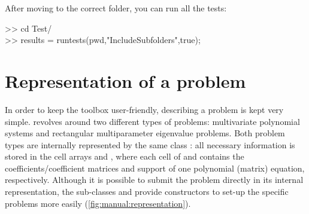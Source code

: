 \documentclass{manual}
\begin{document}
            \begin{code}
                After moving to the correct folder, you can run all the tests:
                \begin{codeblock}
                    >> cd \textcolor{string}{Test/} \\
                    >> results = runtests(pwd,\textcolor{string}{"IncludeSubfolders"},true);
                \end{codeblock}
            \end{code}
            
    \section{Representation of a problem}
        \label{sec:manual:representation}

        In order to keep the toolbox user-friendly, describing a problem is kept very simple.
        \maclab\space revolves around two different types of problems: multivariate polynomial systems and rectangular multiparameter eigenvalue problems. 
        Both problem types are internally represented by the same class : all necessary information is stored in the cell arrays  and , where each cell of  and  contains the coefficients/coefficient matrices and support of one polynomial (matrix) equation, respectively.
        Although it is possible to submit the problem directly in its internal representation, the sub-classes  and  provide constructors to set-up the specific problems more easily (\cref{fig:manual:representation}).
\end{document}
